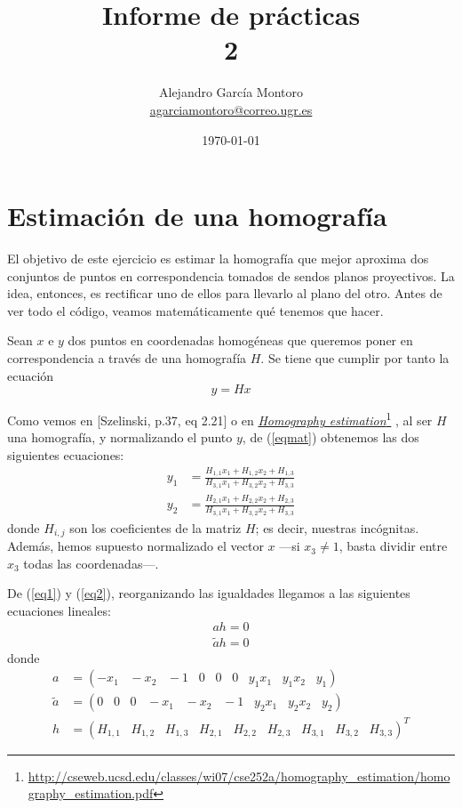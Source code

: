 \documentclass[a4paper, 11pt]{article}
\title{Informe de prácticas \\ 2}
\author{Alejandro García Montoro\\
    \href{mailto:agarciamontoro@correo.ugr.es}{agarciamontoro@correo.ugr.es}}
\date{\today}
\newcommand\fnurl[2]{%
  \href{#2}{#1}\footnote{\url{#2}}%
}
\theoremstyle{definition}
\theoremstyle{theorem}
\begin{document}
  \maketitle

  \section{Estimación de una homografía}
  El objetivo de este ejercicio es estimar la homografía que mejor aproxima dos conjuntos de puntos en correspondencia tomados de sendos planos proyectivos. La idea, entonces, es rectificar uno de ellos para llevarlo al plano del otro. Antes de ver todo el código, veamos matemáticamente qué tenemos que hacer.

  Sean $x$ e $y$ dos puntos en coordenadas homogéneas que queremos poner en correspondencia a través de una homografía $H$. Se tiene que cumplir por tanto la ecuación
  \begin{equation}
      y = Hx \label{eqmat}
  \end{equation}

  Como vemos en [Szelinski, p.37, eq 2.21] o en \fnurl{\emph{Homography estimation}}{http://cseweb.ucsd.edu/classes/wi07/cse252a/homography_estimation/homography_estimation.pdf}, al ser $H$ una homografía, y normalizando el punto $y$, de (\ref{eqmat}) obtenemos las dos siguientes ecuaciones:
  \begin{align}
      y_1 &= \frac{H_{1,1}x_1 + H_{1,2}x_2 + H_{1,3}}{H_{3,1}x_1 + H_{3,2}x_2 + H_{3,3}} \label{eq1}\\
      y_2 &= \frac{H_{2,1}x_1 + H_{2,2}x_2 + H_{2,3}}{H_{3,1}x_1 + H_{3,2}x_2 + H_{3,3}} \label{eq2}
  \end{align}
  donde $H_{i,j}$ son los coeficientes de la matriz $H$; es decir, nuestras incógnitas. Además, hemos supuesto normalizado el vector $x$ ---si $x_3\neq1$, basta dividir entre $x_3$ todas las coordenadas---.

  De (\ref{eq1}) y (\ref{eq2}), reorganizando las igualdades llegamos a las siguientes ecuaciones lineales:
  \begin{align}
      ah = 0 \label{lineal1}\\
      \tilde{a}h = 0 \label{lineal2}
  \end{align}
  donde
  \begin{align*}
      a &= (-x_1 \;\;\; -x_2 \;\;\; -1 \;\;\; 0 \;\;\; 0 \;\;\; 0 \;\;\; y_1x_1 \;\;\; y_1x_2 \;\;\; y_1) \\
      \tilde{a} &= (0 \;\;\; 0 \;\;\; 0 \;\;\; -x_1 \;\;\; -x_2 \;\;\; -1 \;\;\; y_2x_1 \;\;\; y_2x_2 \;\;\; y_2) \\
      h &= (H_{1,1} \;\;\; H_{1,2} \;\;\; H_{1,3} \;\;\; H_{2,1} \;\;\; H_{2,2} \;\;\; H_{2,3} \;\;\; H_{3,1} \;\;\; H_{3,2} \;\;\; H_{3,3})^T
  \end{align*}
\end{document}
